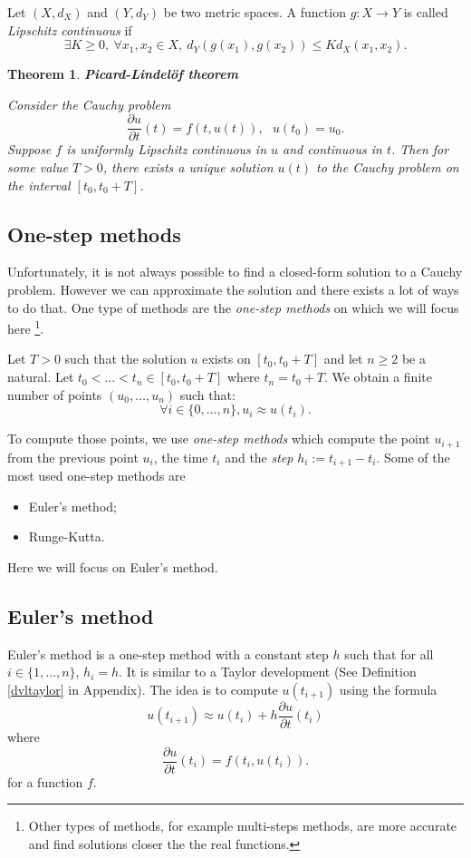 \documentclass[10pt,a4paper]{article}
\theoremstyle{definition}
\theoremstyle{plain}
\newtheorem{theorem}{Theorem}
\begin{document}
Let $(X, d_X)$ and $(Y, d_Y)$ be two metric spaces.  
A function $g: X \rightarrow  Y$ is called \textit{Lipschitz continuous} if
$$
\exists K \geq 0, \  \forall x_1, x_2 \in X, \  d_Y(g(x_1), g(x_2)) \leq Kd_X(x_1, x_2).
$$

\begin{theorem}{\textbf{Picard-Lindelöf theorem}}\label{exiunique}

Consider the Cauchy problem
$$
\frac{\partial u}{\partial t} (t) = f(t, u(t)), \ \ \ u(t_0) = u_0.
$$
Suppose $f$ is uniformly Lipschitz continuous in $u$ and continuous in $t$. Then for some value $T > 0$, there exists a unique solution $u(t)$ to the Cauchy problem on the interval $[t_0, t_0 + T]$. 
\end{theorem}

\subsection{One-step methods}
Unfortunately, it is not always possible to find a closed-form solution to a Cauchy problem.
However we can approximate the solution and there exists a lot of ways to do that. One type of methods are the \textit{one-step methods} on which we will focus here \footnote{Other types of methods, for example multi-steps methods, are more accurate and find solutions closer the the real functions.}.

Let $T > 0$ such that the solution $u$ exists on $[t_0, t_0 + T]$ and let $n \geqslant 2$ be a natural. Let  $t_0 < ... < t_n \in [t_0, t_0 + T]$ where $t_n = t_0 + T$. We obtain a finite number of points $(u_0, \dots, u_n)$ such that:
$$
\forall i\in \{0,\dots, n\},  u_i \approx u(t_i).
$$

To compute those points, we use \textit{one-step methods} which compute the point $u_{i+1}$ from the previous point $u_i$, the time $t_i$ and the \textit{step} $h_i := t_{i+1} - t_i$. Some of the most used one-step methods are
\begin{itemize}
\item Euler's method;
\item Runge-Kutta.
\end{itemize}

Here we will focus on Euler's method.

\subsection{Euler's method} \label{euler}
Euler's method is a one-step method with a constant step $h$ such that for all $i \in \{1, \dots, n\}$, $h_i = h$. It is similar to a Taylor development (See Definition \ref{dvltaylor} in Appendix). The idea is to compute $u(t_{i+1})$ using the formula
\begin{equation}\label{eqeuler}
u(t_{i+1}) \approx u(t_i) + h\frac{\partial u}{\partial t}(t_i)
\end{equation}
where 
$$
\frac{\partial u}{\partial t}(t_i) = f(t_i, u(t_i)).
$$
for a function $f$.
\end{document}

